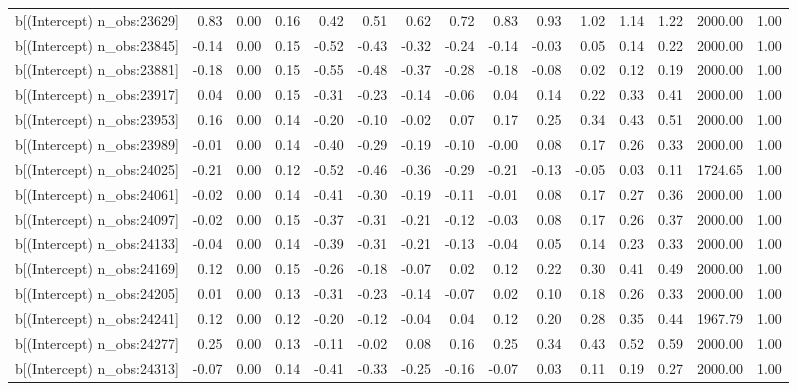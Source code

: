 \begin{table}[ht]
\begin{tabular}{rrrrrrrrrrrrrrr}
  b[(Intercept) n\_obs:23629] & 0.83 & 0.00 & 0.16 & 0.42 & 0.51 & 0.62 & 0.72 & 0.83 & 0.93 & 1.02 & 1.14 & 1.22 & 2000.00 & 1.00 \\ 
  b[(Intercept) n\_obs:23845] & -0.14 & 0.00 & 0.15 & -0.52 & -0.43 & -0.32 & -0.24 & -0.14 & -0.03 & 0.05 & 0.14 & 0.22 & 2000.00 & 1.00 \\ 
  b[(Intercept) n\_obs:23881] & -0.18 & 0.00 & 0.15 & -0.55 & -0.48 & -0.37 & -0.28 & -0.18 & -0.08 & 0.02 & 0.12 & 0.19 & 2000.00 & 1.00 \\ 
  b[(Intercept) n\_obs:23917] & 0.04 & 0.00 & 0.15 & -0.31 & -0.23 & -0.14 & -0.06 & 0.04 & 0.14 & 0.22 & 0.33 & 0.41 & 2000.00 & 1.00 \\ 
  b[(Intercept) n\_obs:23953] & 0.16 & 0.00 & 0.14 & -0.20 & -0.10 & -0.02 & 0.07 & 0.17 & 0.25 & 0.34 & 0.43 & 0.51 & 2000.00 & 1.00 \\ 
  b[(Intercept) n\_obs:23989] & -0.01 & 0.00 & 0.14 & -0.40 & -0.29 & -0.19 & -0.10 & -0.00 & 0.08 & 0.17 & 0.26 & 0.33 & 2000.00 & 1.00 \\ 
  b[(Intercept) n\_obs:24025] & -0.21 & 0.00 & 0.12 & -0.52 & -0.46 & -0.36 & -0.29 & -0.21 & -0.13 & -0.05 & 0.03 & 0.11 & 1724.65 & 1.00 \\ 
  b[(Intercept) n\_obs:24061] & -0.02 & 0.00 & 0.14 & -0.41 & -0.30 & -0.19 & -0.11 & -0.01 & 0.08 & 0.17 & 0.27 & 0.36 & 2000.00 & 1.00 \\ 
  b[(Intercept) n\_obs:24097] & -0.02 & 0.00 & 0.15 & -0.37 & -0.31 & -0.21 & -0.12 & -0.03 & 0.08 & 0.17 & 0.26 & 0.37 & 2000.00 & 1.00 \\ 
  b[(Intercept) n\_obs:24133] & -0.04 & 0.00 & 0.14 & -0.39 & -0.31 & -0.21 & -0.13 & -0.04 & 0.05 & 0.14 & 0.23 & 0.33 & 2000.00 & 1.00 \\ 
  b[(Intercept) n\_obs:24169] & 0.12 & 0.00 & 0.15 & -0.26 & -0.18 & -0.07 & 0.02 & 0.12 & 0.22 & 0.30 & 0.41 & 0.49 & 2000.00 & 1.00 \\ 
  b[(Intercept) n\_obs:24205] & 0.01 & 0.00 & 0.13 & -0.31 & -0.23 & -0.14 & -0.07 & 0.02 & 0.10 & 0.18 & 0.26 & 0.33 & 2000.00 & 1.00 \\ 
  b[(Intercept) n\_obs:24241] & 0.12 & 0.00 & 0.12 & -0.20 & -0.12 & -0.04 & 0.04 & 0.12 & 0.20 & 0.28 & 0.35 & 0.44 & 1967.79 & 1.00 \\ 
  b[(Intercept) n\_obs:24277] & 0.25 & 0.00 & 0.13 & -0.11 & -0.02 & 0.08 & 0.16 & 0.25 & 0.34 & 0.43 & 0.52 & 0.59 & 2000.00 & 1.00 \\ 
  b[(Intercept) n\_obs:24313] & -0.07 & 0.00 & 0.14 & -0.41 & -0.33 & -0.25 & -0.16 & -0.07 & 0.03 & 0.11 & 0.19 & 0.27 & 2000.00 & 1.00 \\ 

\end{tabular}
\end{table}
